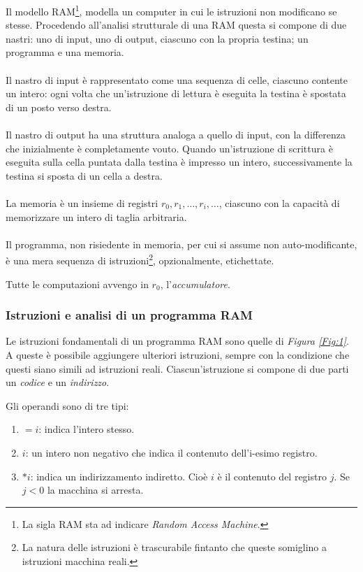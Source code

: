 \documentclass{subfiles}
\begin{document}
Il modello RAM\footnote[2]{La sigla RAM sta ad indicare \emph{Random Access Machine}.}, modella un computer in cui le istruzioni non modificano se stesse.
Procedendo all'analisi strutturale di una RAM questa si compone di due nastri: uno di input, uno di output, ciascuno con la propria testina; un programma e una memoria.
\\ \\
Il nastro di input è rappresentato come una sequenza di celle, ciascuno contente un intero:
ogni volta che un'istruzione di lettura è eseguita la testina è spostata di un posto verso destra.
\\ \\
Il nastro di output ha una struttura analoga a quello di input, con la differenza che inizialmente è completamente vouto.
Quando un'istruzione di scrittura è eseguita sulla cella puntata dalla testina è impresso un intero, successivamente la testina si sposta di un cella a destra.
\\ \\
La memoria è un insieme di registri \(r_{0}, r_{1}, \ldots, r_{i}, \ldots\), ciascuno con la capacità di memorizzare un intero di taglia arbitraria.
\\ \\
Il programma, non risiedente in memoria, per cui si assume non auto-modificante, è una mera sequenza di istruzioni\footnote[3]{La natura delle istruzioni è trascurabile fintanto che queste somiglino a istruzioni macchina reali.}, opzionalmente, etichettate.

\begin{Note*}
    Tutte le computazioni avvengo in \(r_{0}\), l'\emph{accumulatore}.
\end{Note*}
\clearpage

\subsubsection{Istruzioni e analisi di un programma RAM}
Le istruzioni fondamentali di un programma RAM sono quelle di \emph{Figura \ref{Fig:1}}. A queste è possibile aggiungere ulteriori istruzioni,
sempre con la condizione che questi siano simili ad istruzioni reali. Ciascun'istruzione si compone di due parti un \emph{codice} e un \emph{indirizzo}.



Gli operandi sono di tre tipi:
\begin{enumerate}
    \item \(=i\): indica l'intero stesso.
    \item \(i\): un intero non negativo che indica il contenuto dell'i-esimo registro.
    \item \(*i\): indica un indirizzamento indiretto. Cioè \(i\) è il contenuto del registro \(j\). Se \(j < 0\) la macchina si arresta.
\end{enumerate}
\end{document}
